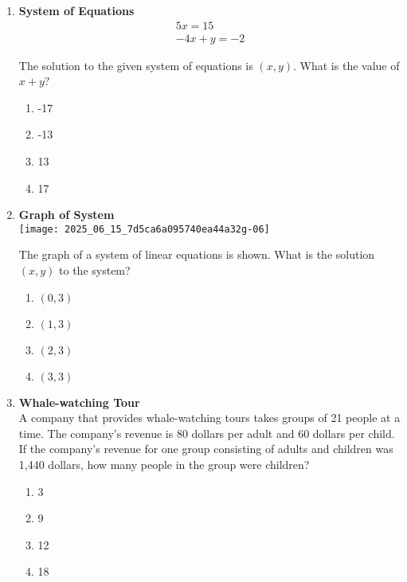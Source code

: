 \begin{enumerate}
\item \textbf{System of Equations}\\
$$
\begin{gathered}
5x = 15 \\
-4x + y = -2
\end{gathered}
$$

The solution to the given system of equations is $(x, y)$. What is the value of $x + y$?
\begin{enumerate}[label=(\Alph*)]
  \item -17
  \item -13
  \item 13
  \item 17
\end{enumerate}
\begin{subanswer}
\end{subanswer}

\item \textbf{Graph of System}\\
\texttt{[image: 2025\_06\_15\_7d5ca6a095740ea44a32g-06]}

The graph of a system of linear equations is shown. What is the solution $(x, y)$ to the system?
\begin{enumerate}[label=(\Alph*)]
  \item $(0,3)$
  \item $(1,3)$
  \item $(2,3)$
  \item $(3,3)$
\end{enumerate}
\begin{subanswer}
\end{subanswer}

\item \textbf{Whale-watching Tour}\\
A company that provides whale-watching tours takes groups of 21 people at a time. The company's revenue is 80 dollars per adult and 60 dollars per child. If the company's revenue for one group consisting of adults and children was 1,440 dollars, how many people in the group were children?
\begin{enumerate}[label=(\Alph*)]
  \item 3
  \item 9
  \item 12
  \item 18
\end{enumerate}
\begin{subanswer}
\end{subanswer}


\end{enumerate}
